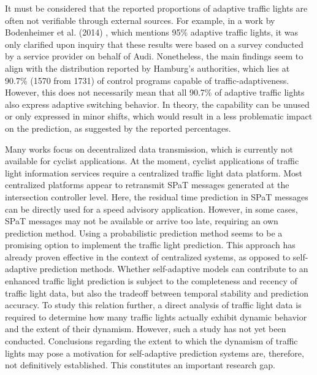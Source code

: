 It must be considered that the reported proportions of adaptive traffic lights are often not verifiable through external sources. For example, in a work by Bodenheimer et al. (2014) \cite{bodenheimer_enabling_2014}, which mentions 95\% adaptive traffic lights, it was only clarified upon inquiry that these results were based on a survey conducted by a service provider on behalf of Audi. Nonetheless, the main findings seem to align with the distribution reported by Hamburg's authorities, which lies at 90.7\% (1570 from 1731) of control programs capable of traffic-adaptiveness. However, this does not necessarily mean that all 90.7\% of adaptive traffic lights also express adaptive switching behavior. In theory, the capability can be unused or only expressed in minor shifts, which would result in a less problematic impact on the prediction, as suggested by the reported percentages.

\begin{Summary}
Many works focus on decentralized data transmission, which is currently not available for cyclist applications. At the moment, cyclist applications of traffic light information services require a centralized traffic light data platform. Most centralized platforms appear to retransmit SPaT messages generated at the intersection controller level. Here, the residual time prediction in SPaT messages can be directly used for a speed advisory application. However, in some cases, SPaT messages may not be available or arrive too late, requiring an own prediction method. Using a probabilistic prediction method seems to be a promising option to implement the traffic light prediction. This approach has already proven effective in the context of centralized systems, as opposed to self-adaptive prediction methods. Whether self-adaptive models can contribute to an enhanced traffic light prediction is subject to the completeness and recency of traffic light data, but also the tradeoff between temporal stability and prediction accuracy. To study this relation further, a direct analysis of traffic light data is required to determine how many traffic lights actually exhibit dynamic behavior and the extent of their dynamism. However, such a study has not yet been conducted. Conclusions regarding the extent to which the dynamism of traffic lights may pose a motivation for self-adaptive prediction systems are, therefore, not definitively established. This constitutes an important research gap.
\end{Summary}


